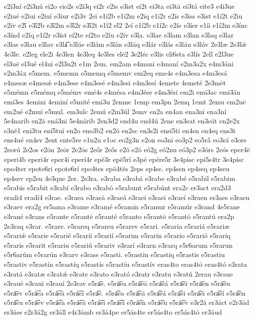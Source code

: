 {e2i3ní
e2i3nú
ei2o
eio2s
e2i3q
ei2r
e2is
e3ist
ei2t
ei3ta
ei3tā
ei3tá
eite3
e4i3ue
e2iué
e2iui
e2iuí
e3iur
e2i3v
2eī
e1ī2b
e1ī2m
e2īq
e1ī2r
e2īs
e3īss
e3īst
e1ī2t
e2īu
e2īv
e2ī́
e3ī́2b
e3ī́2m
e3ī́2r
e3ī́2t
e1ĭ2
eĭ́2
2eí
e1í2b
e1í2c
e2íe
e3íer
e1íi
e1í2m
e3ínc
e3índ
e2íq
e1í2r
e3íst
eí2te
eí2to
e2íu
e2ív
e3la.
e3lae
e3lam
e3lan
e3laq
e3lar
e3las
e3lau
e3lav
e3la͡
e3láe
e3lám
e3lán
e3láq
e3lár
e3lás
e3láu
e3láv
2e3læ
2e3lǽ
4e3le.
e2leg
ele2i
4e3len
4e3leq
4e3les
elē2
3e2léc
e3lis
eli6sta
e3lís
2ell
e2l3ue
el3uē
el3ué
el4ui
e2l3u2t
e1m
2em.
em2am
e4mani
e4maní
e2m3a2x
e4m3áni
e2m3áx
e5mem.
e5memn
e5memq
e5memv
em2eq
eme4s
e4m3esa
e4m3esá
e4mesæ
e4mesǽ
e4m3ese
e4m3esé
e4m3esi
e4m3esí
4emete
4emeté
2e3mēt
e5mémn
e5mémq
e5mémv
emé4s
e4mésa
e4m3ése
e4m3ési
em2i
emi3ac
emi3án
emi3es
4emini
4eminí
e5mité
emi3u
2emne
1emp
em3pn
2emq
1emt
2emu
em2uē
em2ué
e2muī
e5mul.
em3ulc
2emú
e2m3úl
2emv
en2a
en4an
ena3ni
ena3ní
5e4narib
en2ā
ená3ni
5e4nárib
2en3d2
end4u
end4ú
2ene
en3eat
en3eát
en2e2x
e3nĕ1
eni3tu
ení5tuī
en2o
eno3b2
en2ŏ
en2sc
en3s2i
ensi5ti
en4sn
en4sq
ens3t
ens4ué
en4sv
2ent
ente5re
e1n2u
e1oc
eo2g3n
e2on
eo3ni
eo3p2
eo5rā́
eo3rá
e3ors
2eorú
2e2os
e2ōn
2eōr
2e2ōs
2eṓr
2eṓs
e2ŏ
e2ó
eó2g
eó2nu
eó3p2
e3órs
2eós
eper4ē
eperi4b
eperi4r
eper4ī
eperí4r
epĕ3r
epĕ5rĭ
e3pé
epére5r
3e4pisc
epi5s4tr
3e4písc
epo4ter
epote6ri
epote6rí
epo4tes
epŏ4tĕs
2eps
ep4se.
ep4sen
ep4seq
ep4seu
ep4sev
ep2su
4e3que
2er.
2e3ra.
e3raba
e3rabá
e3rabe
e3rabé
e5rabil
e5rabim
e5rabis
e5rabit
e3rabí
e3rabo
e3rabó
e5rabunt
e5rabúnt
era2c
er3act
era2d3
eradi4
eradí4
e3rae.
e3raea
e3raeā
e3raeá
e3raei
e3raeī
e3raeí
e3raen
er3aes
e3raeu
e3raev
era2g
er5ama
e3rame
e3ramé
e5ramin
e5ramur
e5ramúr
e3rand
4e5rane
e3rané
e3rans
e5rante
e5rantē
e5ranté
e5ranto
e5rantō
e5rantó
e5rantú
era2p
2e3raq
e3rar.
e5rare.
e5rareq
e5rareu
e5rarev
e5rari.
e5raria
e5rariá
e5rariæ
e5rariǽ
e5rarie
e5rarié
e5rarii
e5rarií
e5rarim
e5rarin
e5rario
e5rarió
e5rariq
e5raris
e5rarit
e5rariu
e5rariú
e5rariv
e3rarí
e3rarn
e3rarq
e5r6arum
e5rarun
e5r6arúm
e5rarún
e3rarv
e3rass
e5rasti.
e5rastin
e5rastiq
e5rastis
e5rastiu
e5rastiv
e5rastín
e5rastíq
e5rastís
e5rastíu
e5rastív
eras4to
eras4tō
eras4tó
e3rata
e3ratá
e3ratæ
e3ratǽ
e3rate
e3rato
e3rató
e3ratr
e3ratu
e3ratú
2erau
e3raue
e3raué
e3raui
e3rauí
2e3rav
e5ra͞e.
e5ra͞ea
e5ra͞eā
e5ra͞eá
e5ra͞eī
e5ra͞en
e5ra͞eu
e5ra͞ev
e5rá͞ea
e5rá͞eā
e5rá͞eī
e5ra͡e.
e5ra͡ea
e5ra͡eā
e5ra͡eá
e5ra͡ei
e5ra͡eī
e5ra͡eí
e5ra͡en
e5ra͡eu
e5ra͡ev
e5rá͡ea
e5rá͡eā
e5rá͡ei
e5rá͡eī
e5rá͡en
e5rá͡eu
e5rá͡ev
e3r2ă
er3áct
e2r3ád
er3áes
e2r3á2g
er3áll
e4r3ámb
er3á4pe
er5ás4te
er5ás4to
er5ás4tō
er3áud
}
